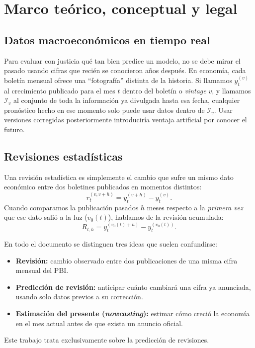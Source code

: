 \section{Marco teórico, conceptual y legal}

\subsection{Datos macroeconómicos en tiempo real}

Para evaluar con justicia qué tan bien predice un modelo, no se debe mirar el pasado usando cifras que recién se conocieron años después. En economía, cada boletín mensual ofrece una ``fotografía'' distinta de la historia. Si llamamos \(y_t^{(v)}\) al crecimiento publicado para el mes \(t\) dentro del boletín o \emph{vintage} \(v\), y llamamos \(\mathcal{I}_v\) al conjunto de toda la información ya divulgada hasta esa fecha, cualquier pronóstico hecho en ese momento solo puede usar datos dentro de \(\mathcal{I}_v\). Usar versiones corregidas posteriormente introduciría ventaja artificial por conocer el futuro.

\subsection{Revisiones estadísticas}

Una revisión estadística es simplemente el cambio que sufre un mismo dato económico entre dos boletines publicados en momentos distintos:
\begin{equation}
	r_{t}^{(v,v+h)}=y_t^{(v+h)}-y_t^{(v)}.
	\label{eq:revision}
\end{equation}
Cuando comparamos la publicación pasados \(h\) meses respecto a la \emph{primera vez} que ese dato salió a la luz (\(v_0(t)\)), hablamos de la revisión acumulada:
\begin{equation}
	R_{t,h}=y_t^{(v_0(t)+h)}-y_t^{(v_0(t))}.
	\label{eq:revision_acum}
\end{equation}

En todo el documento se distinguen tres ideas que suelen confundirse:
\begin{itemize}
	\item \textbf{Revisión:} cambio observado entre dos publicaciones de una misma cifra mensual del PBI.
	\item \textbf{Predicción de revisión:} anticipar cuánto cambiará una cifra ya anunciada, usando solo datos previos a su corrección.
	\item \textbf{Estimación del presente (\emph{nowcasting}):} estimar cómo creció la economía en el mes actual antes de que exista un anuncio oficial.
\end{itemize}
Este trabajo trata exclusivamente sobre la predicción de revisiones.

